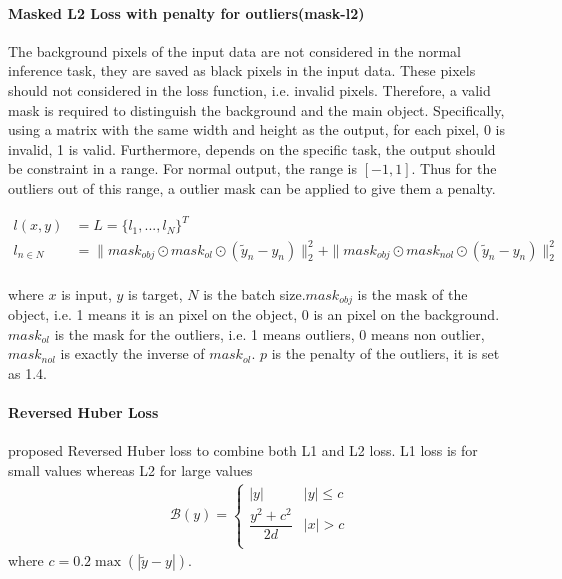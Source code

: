 \paragraph{Masked L2 Loss with penalty for outliers(mask-l2)}
\label{par:maskl2}
The background pixels of the input data are not considered in the normal inference task, they are saved as black pixels in the input data. These pixels should not considered in the loss function, i.e. invalid pixels. Therefore, a valid mask is required to distinguish the background and the main object. Specifically, using a matrix with the same width and height as the output, for each pixel, 0 is invalid, 1 is valid. 
Furthermore, depends on the specific task, the output should be constraint in a range. For normal output, the range is $ [-1,1] $. Thus for the outliers out of this range, a outlier mask can be applied to give them a penalty.

\begin{equation}\label{gcnn-loss}
	\begin{array}{ll}
		l(x,y)&= L  = \{l_1, ..., l_N\}^T\\ 
		l_{n\in N} &= \| mask_{obj} \odot mask_{ol} \odot ( {\tilde y}_n - y_n) \|_2^2 + 	\| mask_{obj} \odot mask_{nol} \odot ( {\tilde y}_n - y_n) \|_2^2 \\
	\end{array}
\end{equation}

where $ x $ is input, $ y $ is target, $ N $ is the batch size.$ mask_{obj} $ is the mask of the object, i.e. 1 means it is an pixel on the object, 0 is an pixel on the background. $ mask_{ol} $ is the mask for the outliers, i.e. 1 means outliers, 0 means non outlier, $ mask_{nol} $ is exactly the inverse of $ mask_{ol} $. $ p $ is the penalty of the outliers, it is set as 1.4.


\paragraph{Reversed Huber Loss}

\cite{berhu-loss} proposed Reversed Huber loss to combine both L1 and L2 loss. L1 loss is for small values whereas L2 for large values
\begin{equation}\label{berhu-loss}
	\begin{array}{ll}
		\mathcal{B}(y)= \begin{cases}
			|y| & |y| \le c \\
			\dfrac{y^2 + c^2}{2d} & |x| > c\\
		\end{cases}
	\end{array}
\end{equation}
where $ c=0.2\max (|\tilde y - y|) $.


